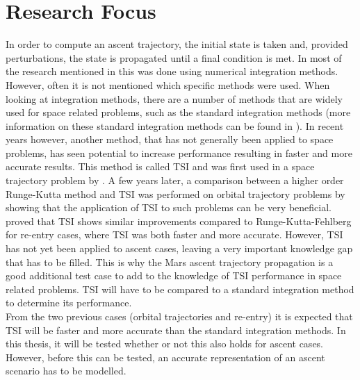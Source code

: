 

\section{Research Focus}
\label{sec:researchFocus}
In order to compute an ascent trajectory, the initial state is taken and, provided perturbations, the state is propagated until a final condition is met. In most of the research mentioned in  this was done using numerical integration methods. However, often it is not mentioned which specific methods were used. When looking at integration methods, there are a number of methods that are widely used for space related problems, such as the standard integration methods (more information on these standard integration methods can be found in ). In recent years however, another method, that has not generally been applied to space problems, has seen potential to increase performance resulting in faster and more accurate results. This method is called \acf{TSI} and was first used in a space trajectory problem by \cite{montenbruck1992numerical}. A few years later, a comparison between a higher order Runge-Kutta method and \ac{TSI} was performed on orbital trajectory problems by \cite{scott2008high} showing that the application of \ac{TSI} to such problems can be very beneficial. \cite{bergsma2016application} proved that \ac{TSI} shows similar improvements compared to Runge-Kutta-Fehlberg for re-entry cases, where \ac{TSI} was both faster and more accurate. However, \ac{TSI} has not yet been applied to ascent cases, leaving a very important knowledge gap that has to be filled. This is why the Mars ascent trajectory propagation is a good additional test case to add to the knowledge of \ac{TSI} performance in space related problems. \ac{TSI} will have to be compared to a standard integration method to determine its performance. \\
From the two previous cases (orbital trajectories and re-entry) it is expected that \ac{TSI} will be faster and more accurate than the standard integration methods. In this thesis, it will be tested whether or not this also holds for ascent cases. However, before this can be tested, an accurate representation of an ascent scenario has to be modelled. 
 


